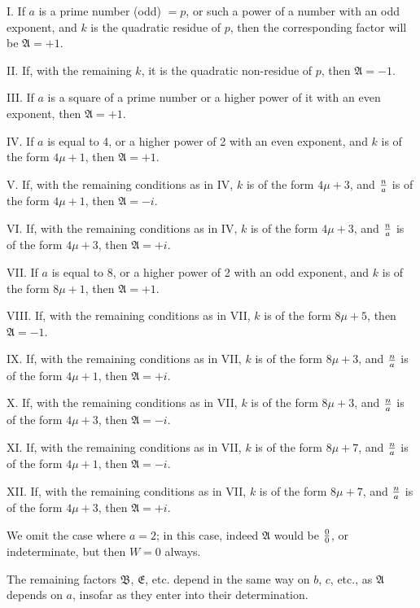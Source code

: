 \documentclass[twoside,12pt, showframe]{memoir}
\let\oldfrac\frac
\def\frac#1#2{\mathchoice{\tfrac{#1}{#2}}{\oldfrac{#1}{#2}}{\genfrac{}{}{}{2}{#1}{#2\mathstrut}}{\genfrac{}{}{}{3}{#1}{#2\mathstrut}}}
\begin{document}
I. If \(a\) is a prime number (odd) \(=p\), or such a power of a number with an odd exponent, and \(k\) is the quadratic residue of \(p\), then the corresponding factor will be \(\mathfrak{A}=+1\).
 
II. If, with the remaining \(k\), it is the quadratic non-residue of \(p\), then \(\mathfrak{A}=-1\).
 
III. If \(a\) is a square of a prime number or a higher power of it with an even exponent, then \(\mathfrak{A}=+1\).
%

IV. If \(a\) is equal to 4, or a higher power of 2 with an even exponent, and \(k\) is of the form \(4 \mu+1\), then \(\mathfrak{A}=+1\).
 
V. If, with the remaining conditions as in IV, \(k\) is of the form \(4 \mu+3\), and \(\frac{n}{a}\) is of the form \(4 \mu+1\), then \(\mathfrak{A}=-i\).
 
VI. If, with the remaining conditions as in IV, \(k\) is of the form \(4 \mu+3\), and \(\frac{n}{a}\) is of the form \(4 \mu+3\), then \(\mathfrak{A}=+i\).
 
VII. If \(a\) is equal to 8, or a higher power of 2 with an odd exponent, and \(k\) is of the form \(8 \mu+1\), then \(\mathfrak{A}=+1\).
 
VIII. If, with the remaining conditions as in VII, \(k\) is of the form \(8 \mu+5\), then \(\mathfrak{A}=-1\).
 
IX. If, with the remaining conditions as in VII, \(k\) is of the form \(8 \mu+3\), and \(\frac{n}{a}\) is of the form \(4 \mu+1\), then \(\mathfrak{A}=+i\).\clearpage\noindent%
 
X. If, with the remaining conditions as in VII, \(k\) is of the form \(8 \mu+3\), and \(\frac{n}{a}\) is of the form \(4 \mu+3\), then \(\mathfrak{A}=-i\).
 
XI. If, with the remaining conditions as in VII, \(k\) is of the form \(8 \mu+7\), and \(\frac{n}{a}\) is of the form \(4 \mu+1\), then \(\mathfrak{A}=-i\).
 
XII. If, with the remaining conditions as in VII, \(k\) is of the form \(8 \mu+7\), and \(\frac{n}{a}\) is of the form \(4 \mu+3\), then \(\mathfrak{A}=+i\).
 
We omit the case where \(a=2\); in this case, indeed \(\mathfrak{A}\) would be \(\frac{0}{0}\), or indeterminate, but then \(W=0\) always.
 
The remaining factors \(\mathfrak{B}\), \(\mathfrak{E}\), etc. depend in the same way on \(b\), \(c\), etc., as \(\mathfrak{A}\) depends on \(a\), insofar as they enter into their determination.
%
\end{document}
